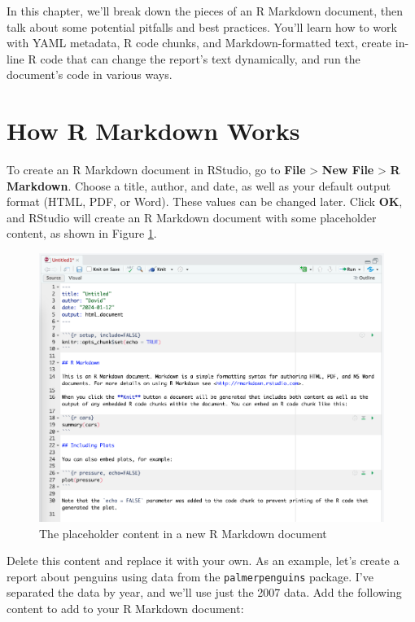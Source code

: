 \documentclass[
]{book}
\begin{document}
In this chapter, we'll break down the pieces of an R Markdown document, then talk about some potential pitfalls and best practices. You'll learn how to work with YAML metadata, R code chunks, and Markdown-formatted text, create in-line R code that can change the report's text dynamically, and run the document's code in various ways.

\hypertarget{how-r-markdown-works}{%
\section*{How R Markdown Works}\label{how-r-markdown-works}}

To create an R Markdown document in RStudio, go to \textbf{File} \textgreater{} \textbf{New File} \textgreater{} \textbf{R Markdown}. Choose a title, author, and date, as well as your default output format (HTML, PDF, or Word). These values can be changed later. Click \textbf{OK}, and RStudio will create an R Markdown document with some placeholder content, as shown in Figure \ref{fig:default-rmd-content}.

\begin{figure}
\includegraphics[width=1\linewidth]{assets/default-rmd-content} \caption{The placeholder content in a new R Markdown document}\label{fig:default-rmd-content}
\end{figure}

Delete this content and replace it with your own. As an example, let's create a report about penguins using data from the \texttt{palmerpenguins} package. I've separated the data by year, and we'll use just the 2007 data. Add the following content to add to your R Markdown document:
\end{document}
